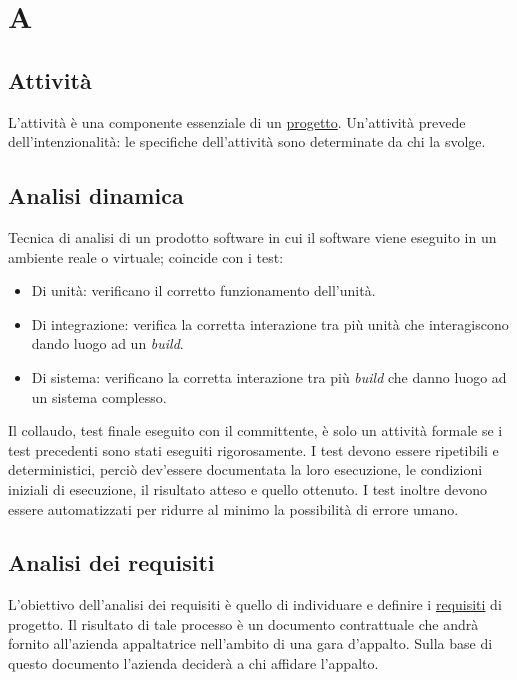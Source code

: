 





\copertina


\tableofcontents

\newpage
	\section{A}
	\subsection{Attività}
	\label{sec:attivita}
	L'attività è una componente essenziale di un \hyperref[sec:progetto]{progetto}. Un'attività prevede dell'intenzionalità: le specifiche dell'attività sono determinate da chi la svolge. 	
	
	\subsection{Analisi dinamica}
	\label{sec:analisidinamica}
	Tecnica di analisi di un prodotto software in cui il software viene eseguito in un ambiente reale o virtuale; coincide con i test: 
	\begin{itemize}  
		\item Di unità: verificano il corretto funzionamento dell'unità.
		\item Di integrazione: verifica la corretta interazione tra più unità che interagiscono dando luogo ad un \emph{build}.
		\item Di sistema: verificano la corretta interazione tra più \emph{build} che danno luogo ad un sistema complesso.
	\end{itemize}	
	Il collaudo, test finale eseguito con il committente, è solo un attività formale se i test precedenti sono stati eseguiti rigorosamente. I test devono essere ripetibili e deterministici, perciò dev'essere documentata la loro esecuzione, le condizioni iniziali di esecuzione, il risultato atteso e quello ottenuto. I test inoltre devono essere automatizzati per ridurre al minimo la possibilità di errore umano.
	
	\subsection{Analisi dei requisiti}
	\label{sec:analisirequisiti}
	L'obiettivo dell'analisi dei requisiti è quello di individuare e definire i \hyperref[sec:requisito]{requisiti} di progetto. Il risultato di tale processo è un documento contrattuale che andrà fornito all'azienda appaltatrice nell'ambito di una gara d'appalto. Sulla base di questo documento l'azienda deciderà a chi affidare l'appalto.
	
